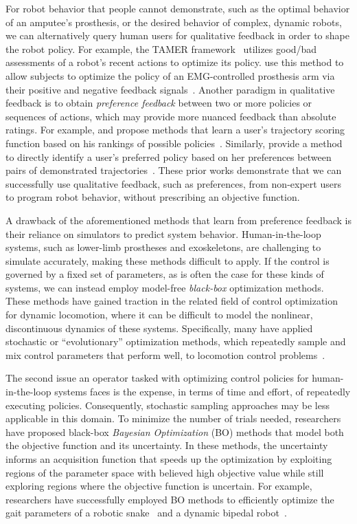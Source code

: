 For robot behavior that people cannot demonstrate, such as the optimal behavior
of an amputee's prosthesis, or the desired behavior of complex, dynamic robots,
we can alternatively query human users for qualitative feedback in order to
shape the robot policy. For example, the TAMER
framework~\citep{knox2009interactively, knox2013training} utilizes good/bad
assessments of a robot's recent actions to optimize its policy.
\citeauthor{pilarski2011online} use this method to allow subjects to optimize
the policy of an EMG-controlled prosthesis arm via their positive and negative
feedback signals~\citep{pilarski2011online}.  Another paradigm in qualitative
feedback is to obtain \emph{preference feedback} between two or more policies or
sequences of actions, which may provide more nuanced feedback than absolute
ratings. For example, \citeauthor{jain2013learning} and
\citeauthor{akrour2014programming} propose methods that learn a user's
trajectory scoring function based on his rankings of possible
policies~\citep{jain2013learning, akrour2014programming}. Similarly,
\citeauthor{wilson2012bayesian} provide a method to directly identify a user's
preferred policy based on her preferences between pairs of demonstrated
trajectories~\citep{wilson2012bayesian}. These prior works demonstrate that we
can successfully use qualitative feedback, such as preferences, from non-expert
users to program robot behavior, without prescribing an objective function.

A drawback of the aforementioned methods that learn from preference feedback is
their reliance on simulators to predict system behavior. Human-in-the-loop
systems, such as lower-limb prostheses and exoskeletons, are challenging to
simulate accurately, making these methods difficult to apply. If the control is
governed by a fixed set of parameters, as is often the case for these kinds of
systems, we can instead employ model-free \emph{black-box} optimization methods.
These methods have gained traction in the related field of control optimization
for dynamic locomotion, where it can be difficult to model the nonlinear,
discontinuous dynamics of these systems.  Specifically, many have applied
stochastic or ``evolutionary'' optimization methods, which repeatedly sample and
mix control parameters that perform well, to locomotion control
problems~\citep{gong2010review}. 

The second issue an operator tasked with optimizing control policies for
human-in-the-loop systems faces is the expense, in terms of time and effort, of
repeatedly executing policies. Consequently, stochastic sampling approaches may
be less applicable in this domain. To minimize the number of trials needed,
researchers have proposed black-box \emph{Bayesian Optimization} (BO) methods
that model both the objective function and its uncertainty. In these methods,
the uncertainty informs an acquisition function that speeds up the
optimization by exploiting regions of the parameter space with believed high
objective value while still exploring regions where the objective function is
uncertain. For example, researchers have successfully employed BO methods to
efficiently optimize the gait parameters of a robotic
snake~\citep{tesch2011using} and a dynamic bipedal
robot~\citep{calandra2014bayesian}.

